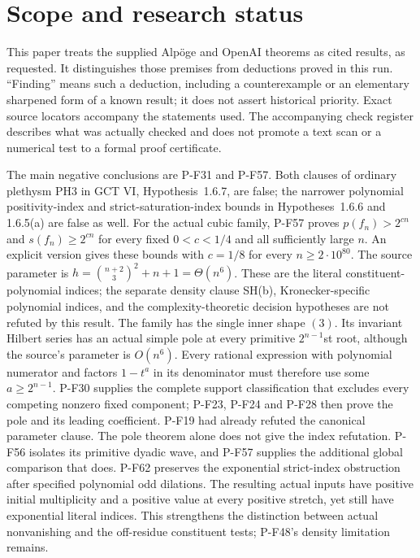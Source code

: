 \section*{Scope and research status}
This paper treats the supplied Alp\"oge and OpenAI theorems as cited
results, as requested. It distinguishes those premises from deductions
proved in this run. ``Finding'' means such a deduction, including a
counterexample or an elementary sharpened form of a known result; it does
not assert historical priority. Exact source locators accompany the
statements used. The accompanying check register describes what was
actually checked and does not promote a text scan or a numerical test to
a formal proof certificate.

The main negative conclusions are P-F31 and P-F57. Both clauses of
ordinary plethysm PH3 in GCT VI, Hypothesis~1.6.7, are false;
the narrower polynomial positivity-index and strict-saturation-index
bounds in Hypotheses~1.6.6 and 1.6.5(a) are false as well.
For the actual cubic family, P-F57 proves
$p(f_n)>2^{cn}$ and $s(f_n)\ge2^{cn}$ for every fixed
$0<c<1/4$ and all sufficiently large $n$.
An explicit version gives these bounds with $c=1/8$ for
every $n\ge2\cdot10^{80}$. The source parameter is
$h=\binom{n+2}{3}^2+n+1=\Theta(n^6)$.
These are the literal constituent-polynomial indices; the
separate density clause SH(b), Kronecker-specific polynomial
indices, and the complexity-theoretic decision hypotheses
are not refuted by this result. The family has
the single inner shape $(3)$. Its invariant Hilbert series has an
actual simple pole at every primitive $2^{n-1}$st root, although the
source's parameter is $O(n^6)$. Every rational expression with
polynomial numerator and factors $1-t^a$ in its denominator must
therefore use some $a\ge2^{n-1}$. P-F30 supplies the complete
support classification that excludes every competing nonzero fixed
component; P-F23, P-F24 and P-F28 then prove the pole and its leading
coefficient. P-F19 had already refuted the canonical parameter clause.
The pole theorem alone does not give the index refutation.
P-F56 isolates its primitive dyadic wave, and P-F57 supplies
the additional global comparison that does.
P-F62 preserves the exponential strict-index obstruction after
specified polynomial odd dilations.  The resulting actual inputs
have positive initial multiplicity and a positive value at every
positive stretch, yet still have exponential literal indices.
This strengthens the distinction between actual nonvanishing and
the off-residue constituent tests; P-F48's density limitation remains.

